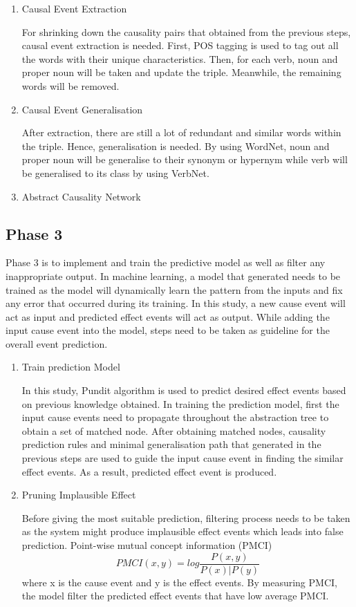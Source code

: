 \documentclass[twoside]{utmthesis}
\begin{document}
\begin{enumerate}[label=(\alph*)]
	\item Causal Event Extraction
	
	For shrinking down the causality pairs that obtained from the previous steps, causal event extraction is needed. First, POS tagging is used to tag out all the words with their unique characteristics. Then, for each verb, noun and proper noun will be taken and update the triple. Meanwhile, the remaining words will be removed. 
	
	\item Causal Event Generalisation
	
	After extraction, there are still a lot of redundant and similar words within the triple. Hence, generalisation is needed. By using WordNet, noun and proper noun will be generalise to their synonym or hypernym while verb will be generalised to its class by using VerbNet. 
	
	\item Abstract Causality Network
	
	
\end{enumerate}
\subsection{Phase 3}
Phase 3 is to implement and train the predictive model as well as filter any inappropriate output. In machine learning, a model that generated needs to be trained as the model will dynamically learn the pattern from the inputs and fix any error that occurred during its training. In this study, a new cause event will act as input and predicted effect events will act as output. While adding the input cause event into the model, steps need to be taken as guideline for the overall event prediction.  
\begin{enumerate}[label=(\alph*)]
	\item Train prediction Model
	
	In this study, Pundit algorithm is used to predict desired effect events based on previous knowledge obtained. In training the prediction model, first the input cause events need to propagate throughout the abstraction tree to obtain a set of matched node. After obtaining matched nodes, causality prediction rules and minimal generalisation path that generated in the previous steps are used to guide the input cause event in finding the similar effect events. As a result, predicted effect event is produced. 
	 
	\item Pruning Implausible Effect
	
	Before giving the most suitable prediction, filtering process needs to be taken as the system might produce implausible effect events which leads into false prediction. Point-wise mutual concept information (PMCI)
	\begin{equation}\label{3.2}
	PMCI(x,y) = log \frac{P(x,y)}{P(x) | P(y)} 
	\end{equation}where x is the cause event and y is the effect events. By measuring PMCI, the model filter the predicted effect events that have low average PMCI.  

\end{enumerate}
\end{document}
